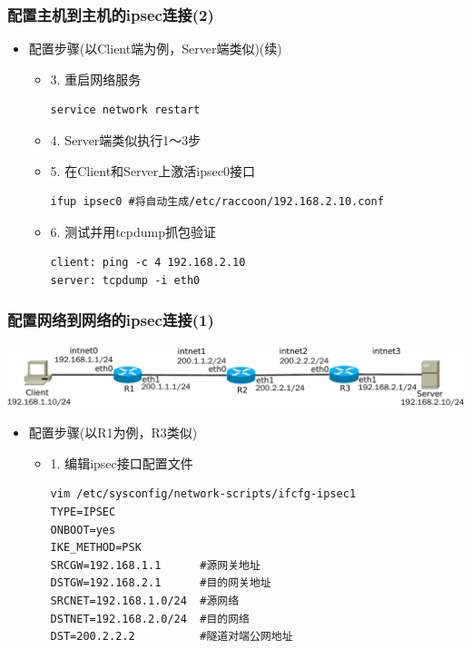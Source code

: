 \documentclass[xcolor=svgnames,presentation]{beamer}
\begin{document}
\begin{frame}[fragile]
\frametitle{配置主机到主机的ipsec连接(2)}
\label{sec-4-11}
\begin{itemize}

\item 配置步骤(以Client端为例，Server端类似)(续)
\label{sec-4-11-1}%
\begin{itemize}

\item 3. 重启网络服务\\
\label{sec-4-11-1-1}%
\begin{verbatim}
service network restart
\end{verbatim}

\item 4. Server端类似执行1～3步
\label{sec-4-11-1-2}%

\item 5. 在Client和Server上激活ipsec0接口\\
\label{sec-4-11-1-3}%
\begin{verbatim}
ifup ipsec0 #将自动生成/etc/raccoon/192.168.2.10.conf
\end{verbatim}

\item 6. 测试并用tcpdump抓包验证\\
\label{sec-4-11-1-4}%
\begin{verbatim}
client: ping -c 4 192.168.2.10
server: tcpdump -i eth0
\end{verbatim}
\end{itemize} %
\end{itemize} %
\end{frame}
\begin{frame}[fragile]
\frametitle{配置网络到网络的ipsec连接(1)}
\label{sec-4-12}

\includegraphics[width=.9\linewidth]{img/vpnlab.pdf}
\begin{itemize}

\item 配置步骤(以R1为例，R3类似)
\label{sec-4-12-1}%
\begin{itemize}

\item 1. 编辑ipsec接口配置文件\\
\label{sec-4-12-1-1}%
\begin{verbatim}
vim /etc/sysconfig/network-scripts/ifcfg-ipsec1
TYPE=IPSEC
ONBOOT=yes
IKE_METHOD=PSK
SRCGW=192.168.1.1      #源网关地址
DSTGW=192.168.2.1      #目的网关地址
SRCNET=192.168.1.0/24  #源网络
DSTNET=192.168.2.0/24  #目的网络
DST=200.2.2.2          #隧道对端公网地址
\end{verbatim}
\end{itemize} %
\end{itemize} %
\end{frame}
\end{document}
